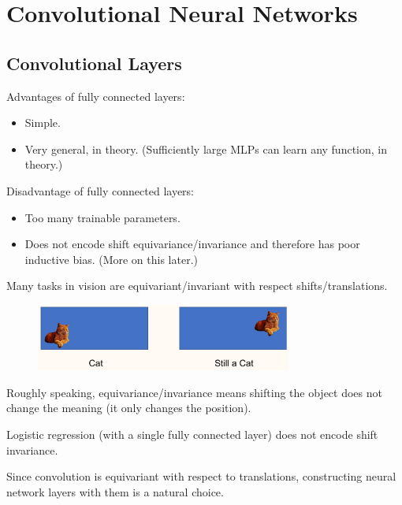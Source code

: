 \chapter{Convolutional Neural Networks}

\section{Convolutional Layers}

\begin{concept}
    Advantages of fully connected layers:

    \begin{itemize}
        \item Simple.
        \item Very general, in theory. (Sufficiently large MLPs can learn any function, in theory.)
    \end{itemize}

    Disadvantage of fully connected layers:

    \begin{itemize}
        \item Too many trainable parameters.
        \item Does not encode shift equivariance/invariance and therefore has poor inductive bias. (More on this later.)
    \end{itemize}
\end{concept}

\begin{concept}
    Many tasks in vision are equivariant/invariant with respect shifts/translations.

    \begin{figure}[H]
        \centering
        \includegraphics[width=0.75\textwidth]{.././assets/5.1.png}
    \end{figure}

    Roughly speaking, equivariance/invariance means shifting the object does not change the meaning (it only changes the position).

    Logistic regression (with a single fully connected layer) does not encode shift invariance.

    Since convolution is equivariant with respect to translations, constructing neural network layers with them is a natural choice.
\end{concept}

